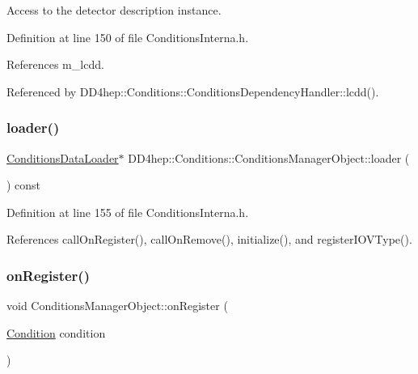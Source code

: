 Access to the detector description instance. 



Definition at line 150 of file Conditions\+Interna.\+h.



References m\+\_\+lcdd.



Referenced by D\+D4hep\+::\+Conditions\+::\+Conditions\+Dependency\+Handler\+::lcdd().

\hypertarget{class_d_d4hep_1_1_conditions_1_1_conditions_manager_object_a0d4a2c082f554f4ece6f298185d8b6bc}{}\label{class_d_d4hep_1_1_conditions_1_1_conditions_manager_object_a0d4a2c082f554f4ece6f298185d8b6bc} 
\subsubsection{\texorpdfstring{loader()}{loader()}}
{\footnotesize\ttfamily \hyperlink{class_d_d4hep_1_1_conditions_1_1_conditions_data_loader}{Conditions\+Data\+Loader}$\ast$ D\+D4hep\+::\+Conditions\+::\+Conditions\+Manager\+Object\+::loader (\begin{DoxyParamCaption}{ }\end{DoxyParamCaption}) const\hspace{0.3cm}{\ttfamily [inline]}}



Definition at line 155 of file Conditions\+Interna.\+h.



References call\+On\+Register(), call\+On\+Remove(), initialize(), and register\+I\+O\+V\+Type().

\hypertarget{class_d_d4hep_1_1_conditions_1_1_conditions_manager_object_a872970f1bb67a3d225be8c63422f848f}{}\label{class_d_d4hep_1_1_conditions_1_1_conditions_manager_object_a872970f1bb67a3d225be8c63422f848f} 
\subsubsection{\texorpdfstring{on\+Register()}{onRegister()}}
{\footnotesize\ttfamily void Conditions\+Manager\+Object\+::on\+Register (\begin{DoxyParamCaption}\item[{\hyperlink{class_d_d4hep_1_1_conditions_1_1_condition}{Condition}}]{condition }\end{DoxyParamCaption})\hspace{0.3cm}{\ttfamily [protected]}}



